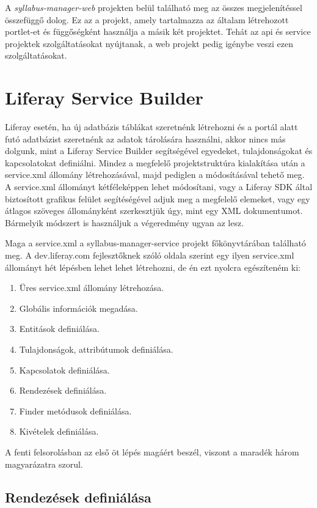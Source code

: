 \documentclass[hidelinks, 12pt, a4paper]{report}
\begin{document}
A \emph{syllabus-manager-web} projekten belül található meg az összes megjelenítéssel összefüggő dolog. Ez az a projekt, amely tartalmazza az általam létrehozott portlet-et és függőségként használja a másik két projektet. Tehát az api és service projektek szolgáltatásokat nyújtanak, a web projekt pedig igénybe veszi ezen szolgáltatásokat.

\section{Liferay Service Builder}

Liferay esetén, ha új adatbázis táblákat szeretnénk létrehozni és a portál alatt futó adatbázist szeretnénk az adatok tárolására használni, akkor nincs más dolgunk, mint a Liferay Service Builder segítségével egyedeket, tulajdonságokat és kapcsolatokat definiálni. Mindez a megfelelő projektstruktúra kialakítása után a service.xml állomány létrehozásával, majd pediglen a módosításával tehető meg. A service.xml állományt kétféleképpen lehet módosítani, vagy a Liferay SDK által biztosított grafikus felület segítéségével adjuk meg a megfelelő elemeket, vagy egy átlagos szöveges állományként szerkesztjük úgy, mint egy XML dokumentumot. Bármelyik módszert is használjuk a végeredmény ugyan az lesz.

Maga a service.xml a syllabus-manager-service projekt főkönyvtárában található meg. A dev.liferay.com fejlesztőknek szóló oldala szerint egy ilyen service.xml állományt hét lépésben lehet lehet létrehozni, de én ezt nyolcra egészíteném ki:
\begin{enumerate}
\item Üres service.xml állomány létrehozása.
\item Globális információk megadása.
\item Entitások definiálása.
\item Tulajdonságok, attribútumok definiálása.
\item Kapcsolatok definiálása.
\item Rendezések definiálása.
\item Finder metódusok definiálása.
\item Kivételek definiálása.
\end{enumerate}

A fenti felsorolásban az első öt lépés magáért beszél, viszont a maradék három magyarázatra szorul.

\subsection{Rendezések definiálása}
\end{document}
